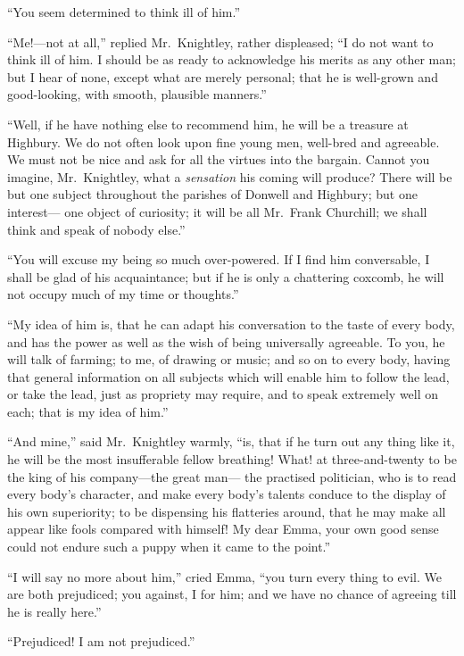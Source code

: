 ``You seem determined to think ill of him.''

``Me!---not at all,'' replied Mr.\ Knightley, rather displeased; ``I do
not want to think ill of him.  I should be as ready to acknowledge
his merits as any other man; but I hear of none, except what are
merely personal; that he is well-grown and good-looking, with smooth,
plausible manners.''

``Well, if he have nothing else to recommend him, he will be a
treasure at Highbury.  We do not often look upon fine young men,
well-bred and agreeable.  We must not be nice and ask for all
the virtues into the bargain.  Cannot you imagine, Mr.\ Knightley,
what a \emph{sensation} his coming will produce?  There will be but one subject
throughout the parishes of Donwell and Highbury; but one interest---%
one object of curiosity; it will be all Mr.\ Frank Churchill;
we shall think and speak of nobody else.''

``You will excuse my being so much over-powered. If I find him
conversable, I shall be glad of his acquaintance; but if he is only
a chattering coxcomb, he will not occupy much of my time or thoughts.''

``My idea of him is, that he can adapt his conversation to the taste
of every body, and has the power as well as the wish of being
universally agreeable.  To you, he will talk of farming; to me,
of drawing or music; and so on to every body, having that general
information on all subjects which will enable him to follow the lead,
or take the lead, just as propriety may require, and to speak
extremely well on each; that is my idea of him.''

``And mine,'' said Mr.\ Knightley warmly, ``is, that if he turn out any
thing like it, he will be the most insufferable fellow breathing!
What! at three-and-twenty to be the king of his company---the great man---%
the practised politician, who is to read every body's character,
and make every body's talents conduce to the display of his
own superiority; to be dispensing his flatteries around, that he
may make all appear like fools compared with himself!  My dear Emma,
your own good sense could not endure such a puppy when it came
to the point.''

``I will say no more about him,'' cried Emma, ``you turn every
thing to evil.  We are both prejudiced; you against, I for him;
and we have no chance of agreeing till he is really here.''

``Prejudiced!  I am not prejudiced.''

